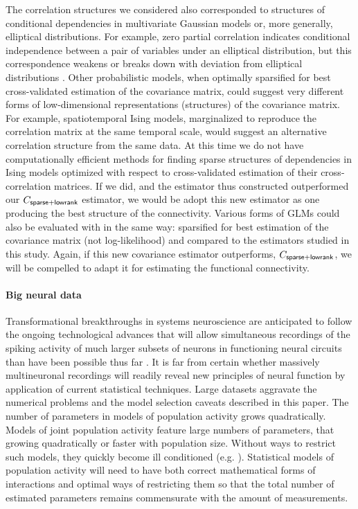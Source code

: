 \documentclass[10pt]{article}
\begin{document}
The correlation structures we considered also corresponded to structures of conditional dependencies in multivariate Gaussian models or, more generally, elliptical distributions. For example, zero partial correlation indicates conditional independence between a pair of variables under an elliptical distribution, but this correspondence weakens or breaks down with deviation from elliptical distributions \cite{Loh:2012}.  Other probabilistic models, when optimally sparsified for best cross-validated estimation of the covariance matrix, could suggest very different forms of low-dimensional representations (structures) of the covariance matrix. For example, spatiotemporal Ising models, marginalized to reproduce the correlation matrix at the same temporal scale, would suggest an alternative correlation structure from the same data. At this time we do not have computationally efficient methods for finding sparse structures of dependencies in Ising models optimized with respect to cross-validated estimation of their cross-correlation matrices. If we did, and the estimator thus constructed outperformed our $C_{\sf sparse+lowrank}$ estimator, we would be adopt this new estimator as one producing the best structure of the connectivity. Various forms of GLMs could also be evaluated with in the same way: sparsified for best estimation of the covariance matrix (not log-likelihood) and compared to the estimators studied in this study.  Again, if this new covariance estimator outperforms, $C_{\sf sparse+lowrank}$, we will be compelled to adapt it for estimating the functional connectivity.

\paragraph{Big neural data}
Transformational breakthroughs in systems neuroscience are anticipated to follow the ongoing technological advances that will allow simultaneous recordings of the spiking activity of much larger subsets of neurons in functioning neural circuits than have been possible thus far \cite{Alivisatos:2013}. It is far from certain whether massively multineuronal recordings will readily reveal new principles of neural function by application of current statistical techniques. Large datasets aggravate the numerical problems and the model selection caveats described in this paper. The number of parameters in models of population activity grows quadratically.  Models of joint population activity feature large numbers of parameters, that growing quadratically or faster with population size. Without ways to restrict such models, they quickly become ill conditioned (e.g. \cite{Roudi:2009}).  Statistical models of population activity will need to have both correct mathematical forms of interactions and optimal ways of restricting them so that the total number of estimated parameters remains commensurate with the amount of measurements. 
\end{document}
